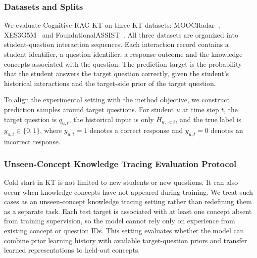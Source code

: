 \documentclass[a4paper,12pt]{article}
\numberwithin{table}{section}
\begin{document}
\subsubsection{Datasets and Splits}

We evaluate Cognitive-RAG KT on three KT datasets: MOOCRadar~\citep{yu2023moocradar}, XES3G5M~\citep{liu2023xes3g5m} and FoundationalASSIST~\citep{worden2026foundationalassist}. All three datasets are organized into student-question interaction sequences. Each interaction record contains a student identifier, a question identifier, a response outcome and the knowledge concepts associated with the question. The prediction target is the probability that the student answers the target question correctly, given the student's historical interactions and the target-side prior of the target question.

To align the experimental setting with the method objective, we construct prediction samples around target questions. For student \(u\) at time step \(t\), the target question is \(q_{u,t}\), the historical input is only \(H_{u,<t}\), and the true label is \(y_{u,t} \in \{0,1\}\), where \(y_{u,t}=1\) denotes a correct response and \(y_{u,t}=0\) denotes an incorrect response.

\begin{table}[H]
\centering
\small
\caption{Overall dataset statistics}
\label{tab:dataset-split-statistics}
\end{table}

\subsubsection{Unseen-Concept Knowledge Tracing Evaluation Protocol}

Cold start in KT is not limited to new students or new questions. It can also occur when knowledge concepts have not appeared during training. We treat such cases as an unseen-concept knowledge tracing setting rather than redefining them as a separate task. Each test target is associated with at least one concept absent from training supervision, so the model cannot rely only on experience from existing concept or question IDs. This setting evaluates whether the model can combine prior learning history with available target-question priors and transfer learned representations to held-out concepts.
\end{document}
